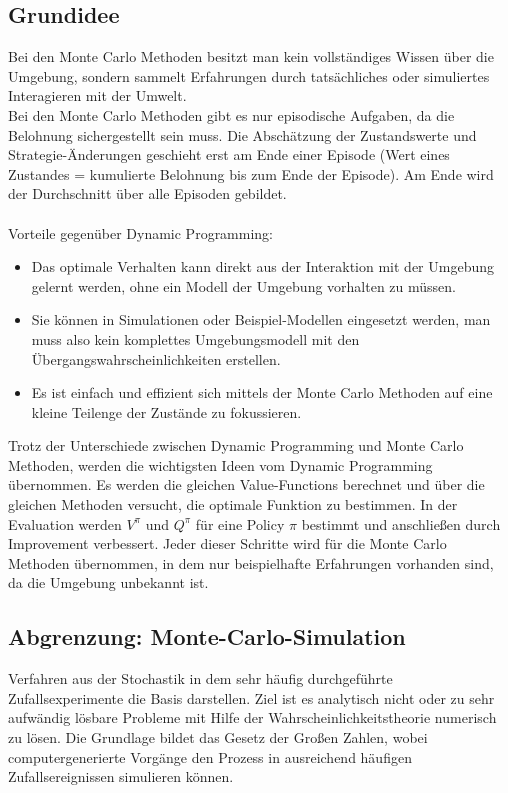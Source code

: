 \documentclass[10pt]{scrartcl}
\begin{document}
\subsection{Grundidee}
Bei den Monte Carlo Methoden besitzt man kein vollständiges Wissen über die Umgebung, sondern sammelt Erfahrungen durch tatsächliches oder simuliertes Interagieren mit der Umwelt.\\
Bei den Monte Carlo Methoden gibt es nur episodische Aufgaben, da die Belohnung sichergestellt sein muss. Die Abschätzung der Zustandswerte und Strategie-Änderungen geschieht erst am Ende einer Episode (Wert eines Zustandes = kumulierte Belohnung bis zum Ende der Episode). Am Ende wird der Durchschnitt über alle Episoden gebildet.\\
\\
Vorteile gegenüber Dynamic Programming:
\begin{itemize}
\item{Das optimale Verhalten kann direkt aus der Interaktion mit der Umgebung gelernt werden, ohne ein Modell der Umgebung vorhalten zu müssen.}
\item{Sie können in Simulationen oder Beispiel-Modellen eingesetzt werden, man muss also kein komplettes Umgebungsmodell mit den Übergangswahrscheinlichkeiten erstellen.}
\item{Es ist einfach und effizient sich mittels der Monte Carlo Methoden auf eine kleine Teilenge der Zustände zu fokussieren.}
\end{itemize}

Trotz der Unterschiede zwischen Dynamic Programming und Monte Carlo Methoden, werden die wichtigsten Ideen vom Dynamic Programming übernommen. Es werden die gleichen Value-Functions berechnet und über die gleichen Methoden versucht, die optimale Funktion zu bestimmen. In der Evaluation werden $V^{\pi}$ und $Q^{\pi}$ für eine Policy $\pi$ bestimmt und anschließen durch Improvement verbessert. Jeder dieser Schritte wird für die Monte Carlo Methoden übernommen, in dem nur beispielhafte Erfahrungen vorhanden sind, da die Umgebung unbekannt ist.

\subsection{Abgrenzung: Monte-Carlo-Simulation}
Verfahren aus der Stochastik in dem sehr häufig durchgeführte Zufallsexperimente die Basis darstellen. Ziel ist es analytisch nicht oder zu sehr aufwändig lösbare Probleme mit Hilfe der Wahrscheinlichkeitstheorie numerisch zu lösen. Die Grundlage bildet das Gesetz der Großen Zahlen, wobei computergenerierte Vorgänge den Prozess in ausreichend häufigen Zufallsereignissen simulieren können.
\end{document}
